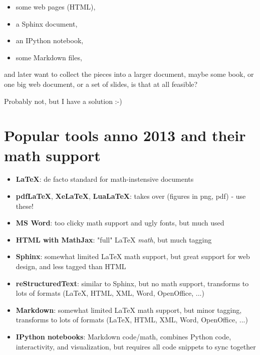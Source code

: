 \documentclass[%
twoside,                 %
draft,                   %
final,                   %
chapterprefix=true,      %
open=right               %
10pt]{book}
\begin{document}
\begin{shadedquoteBlue}
\begin{itemize}
 \item some web pages (HTML),

 \item a Sphinx document,

 \item an IPython notebook,

 \item some Markdown files,
\end{itemize}

\noindent
and later want to collect the pieces into a larger document, maybe
some book, or one big web document, or a set of slides,
is that at all feasible?

Probably not, but I have a solution :-)

\section*{Popular tools anno 2013 and their math support}

\begin{itemize}
 \item \textbf{LaTeX}: de facto standard for math-instensive documents

 \item \textbf{pdfLaTeX}, \textbf{XeLaTeX}, \textbf{LuaLaTeX}: takes over (figures in png, pdf) - use these!

 \item \textbf{MS Word}: too clicky math support and ugly fonts, but much used

 \item \textbf{HTML with MathJax}: "full" {\LaTeX} \emph{math}, but much tagging

 \item \textbf{Sphinx}:
   somewhat limited {\LaTeX} math support, but great support for web design,
   and less tagged than HTML

 \item \textbf{reStructuredText}: similar to Sphinx, but no math support, transforms to
   lots of formats ({\LaTeX}, HTML, XML, Word, OpenOffice, ...)

 \item \textbf{Markdown}: somewhat limited {\LaTeX} math support, but minor tagging,
   transforms to lots of formats ({\LaTeX}, HTML, XML, Word, OpenOffice, ...)

 \item \textbf{IPython notebooks}: Markdown code/math,
   combines Python code, interactivity, and
   visualization, but requires all code snippets to sync together


\end{itemize}
\end{shadedquoteBlue}
\end{document}
